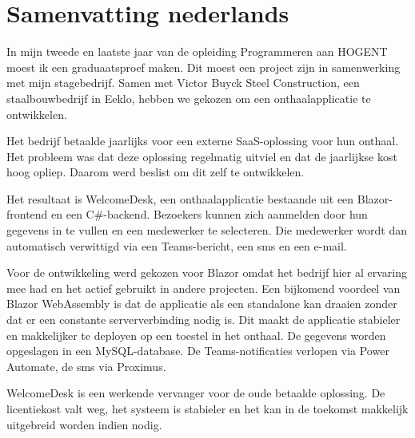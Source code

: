 
\chapter*{Samenvatting nederlands}


In mijn tweede en laatste jaar van de opleiding Programmeren aan HOGENT 
moest ik een graduaatsproef maken. Dit moest een project zijn in samenwerking 
met mijn stagebedrijf. Samen met Victor Buyck Steel Construction, een 
staalbouwbedrijf in Eeklo, hebben we gekozen om een onthaalapplicatie te 
ontwikkelen.

\bigskip
Het bedrijf betaalde jaarlijks voor een externe SaaS-oplossing voor hun 
onthaal. Het probleem was dat deze oplossing regelmatig uitviel en dat de 
jaarlijkse kost hoog opliep. Daarom werd beslist om dit zelf te ontwikkelen.

\bigskip
Het resultaat is WelcomeDesk, een onthaalapplicatie bestaande uit een 
Blazor-frontend en een C\#-backend. Bezoekers kunnen zich aanmelden door 
hun gegevens in te vullen en een medewerker te selecteren. Die medewerker 
wordt dan automatisch verwittigd via een Teams-bericht, een sms en een 
e-mail.

\bigskip
Voor de ontwikkeling werd gekozen voor Blazor omdat het bedrijf hier al 
ervaring mee had en het actief gebruikt in andere projecten. Een 
bijkomend voordeel van Blazor WebAssembly is dat de applicatie als een 
standalone kan draaien zonder dat er een constante 
serververbinding nodig is. Dit maakt de applicatie stabieler en makkelijker 
te deployen op een toestel in het onthaal. De gegevens worden opgeslagen 
in een MySQL-database. De Teams-notificaties verlopen via Power Automate, 
de sms via Proximus.

\bigskip
WelcomeDesk is een werkende vervanger voor de oude betaalde oplossing. 
De licentiekost valt weg, het systeem is stabieler en het kan in de toekomst 
makkelijk uitgebreid worden indien nodig.
